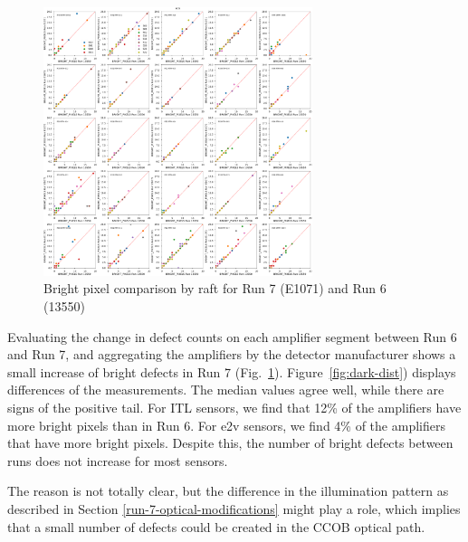 \begin{figure}[ht]
\begin{centering}
\includegraphics[width=0.7\textwidth]{figures/baselineCharacterization/13550_E1071_BRIGHT_PIXELS_inset.png}
\caption{Bright pixel comparison by raft for Run 7 (E1071) and Run 6 (13550)}
\label{fig:bright}
\end{centering}
\end{figure}

Evaluating the change in defect counts on each amplifier segment between Run 6 and Run 7, and aggregating the amplifiers by the detector manufacturer shows a small increase of bright defects in Run 7 (Fig.~\ref{fig:bright}). Figure~\ref{fig:dark-dist}) displays differences of the measurements. The median values agree well, while there are signs of the positive tail. For ITL sensors, we find that 12\% of the amplifiers have more bright pixels than in Run 6. For e2v sensors, we find 4\% of the amplifiers that have more bright pixels. Despite this, the number of bright defects between runs does not increase for most sensors.

The reason is not totally clear, but the difference in the illumination pattern as described in Section \ref{run-7-optical-modifications} might play a role, which implies that a small number of defects could be created in the CCOB optical path.

